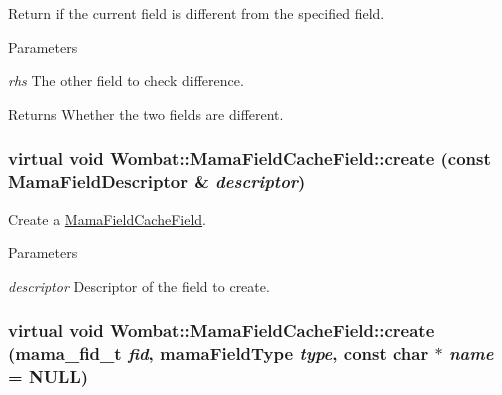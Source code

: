 Return if the current field is different from the specified field. 
\begin{DoxyParams}{Parameters}
\item[{\em rhs}]The other field to check difference. \end{DoxyParams}
\begin{DoxyReturn}{Returns}
Whether the two fields are different. 
\end{DoxyReturn}
\hypertarget{classWombat_1_1MamaFieldCacheField_a50403ebe0fa4fe5619a950b9758ba819}{
\subsubsection[{create}]{\setlength{\rightskip}{0pt plus 5cm}virtual void Wombat::MamaFieldCacheField::create (const {\bf MamaFieldDescriptor} \& {\em descriptor})}}
\label{classWombat_1_1MamaFieldCacheField_a50403ebe0fa4fe5619a950b9758ba819}


Create a \hyperlink{classWombat_1_1MamaFieldCacheField}{MamaFieldCacheField}. 
\begin{DoxyParams}{Parameters}
\item[{\em descriptor}]Descriptor of the field to create. \end{DoxyParams}
\hypertarget{classWombat_1_1MamaFieldCacheField_ac1735aede2db98e3383fe183b1695712}{
\subsubsection[{create}]{\setlength{\rightskip}{0pt plus 5cm}virtual void Wombat::MamaFieldCacheField::create (mama\_\-fid\_\-t {\em fid}, \/  mamaFieldType {\em type}, \/  const char $\ast$ {\em name} = {\ttfamily NULL})}}
\label{classWombat_1_1MamaFieldCacheField_ac1735aede2db98e3383fe183b1695712}


